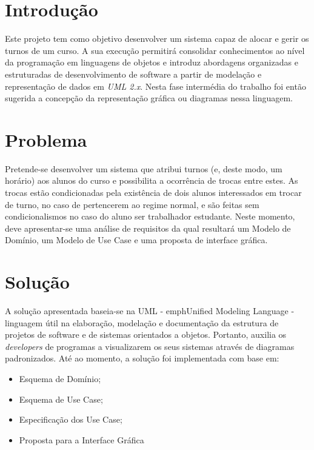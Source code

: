 \documentclass[a4paper]{article}
\begin{document}
\pagebreak
\tableofcontents

\pagebreak
\section{Introdução}
\label{sec:1}

\hspace{3mm}Este projeto tem como objetivo desenvolver um sistema capaz de alocar e gerir os turnos de um curso. A sua execução permitirá consolidar conhecimentos ao nível da programação em linguagens de objetos e introduz abordagens organizadas e estruturadas de desenvolvimento de software a partir de modelação e representação de dados em \emph{UML 2.x}. 
Nesta fase intermédia do trabalho foi então sugerida a concepção da representação gráfica ou diagramas nessa linguagem.

\section{Problema}
\label{sec:2}

\hspace{3mm}

\hspace{3mm}Pretende-se desenvolver um sistema que atribui turnos (e, deste modo, um horário) aos alunos do curso e possibilita a ocorrência de trocas entre estes. As trocas estão condicionadas pela existência de dois alunos interessados em trocar de turno, no caso de pertencerem ao regime normal, e são feitas sem condicionalismos no caso do aluno ser trabalhador estudante.
Neste momento, deve apresentar-se uma análise de requisitos da qual resultará um Modelo de Domínio, um Modelo de Use Case e uma proposta de interface gráfica.

\section{Solução}
\label{sec:3}


\hspace{3mm}A solução apresentada baseia-se na UML - emph{Unified Modeling Language} - linguagem útil na elaboração, modelação e documentação da estrutura de projetos de software e de sistemas orientados a objetos. Portanto, auxilia os \emph{developers} de programas a visualizarem os seus sistemas através de diagramas padronizados.
Até ao momento, a solução foi implementada com base em:

\begin{itemize}
    \item Esquema de Domínio;
    \item Esquema de Use Case;
    \item Especificação dos Use Case;
    \item Proposta para a Interface Gráfica
\end{itemize}
\end{document}
